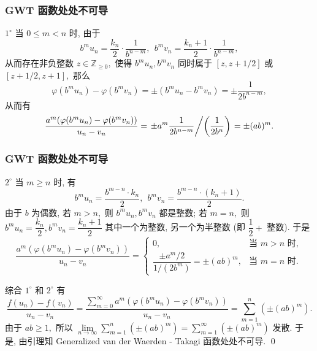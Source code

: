
\begin{frame}
\frametitle{GWT 函数处处不可导}

$1^{\circ}$ 当 $0 \leqslant m < n$ 时, 由于
\begin{equation*}
b^m u_n = \dfrac{k_n}{2} \cdot \dfrac{1}{b^{n-m}}, ~~ b^m v_n = \dfrac{k_n + 1}{2} \cdot \dfrac{1}{b^{n-m}},
\end{equation*}
从而存在非负整数 $z \in \mathbb{Z}_{\geqslant 0},$ 使得 $b^m u_n, b^m v_n$ 同时属于 $[z, z+1/2]$ 或 $[z+1/2, z+1],$ 那么
\begin{equation*}
\varphi(b^m u_n) - \varphi(b^m v_n) = \pm (b^m u_n - b^m v_n) = \pm \dfrac{1}{2 b^{n-m}},
\end{equation*}
从而有
\begin{equation*}
\dfrac{a^m (\varphi(b^m u_n) - \varphi(b^m v_n))}{u_n - v_n}
= \left. \pm a^m \dfrac{1}{2 b^{n-m}} \middle/ \left( \dfrac{1}{2 b^n}\right) \right.
= \pm (ab)^m.
\end{equation*}

\end{frame}


\begin{frame}
\frametitle{GWT 函数处处不可导}

$2^{\circ}$ 当 $m \geqslant n$ 时, 有
\begin{equation*}
b^m u_n = \dfrac{b^{m-n} \cdot k_n}{2}, ~~ b^m v_n = \dfrac{b^{m-n} \cdot (k_n+1)}{2}.
\end{equation*}
由于 $b$ 为偶数, 若 $m > n,$ 则 $b^m u_n, b^m v_n$ 都是整数;
若 $m = n,$ 则 $b^m u_n = \dfrac{k_n}{2}, b^m v_n = \dfrac{k_n + 1}{2}$ 其中一个为整数,
另一个为半整数 (即 $\dfrac{1}{2} +$ 整数). 于是
\begin{equation*}
\dfrac{a^m (\varphi(b^m u_n) - \varphi(b^m v_n))}{u_n - v_n}
= \begin{cases}
0, & \text{当 } m > n \text{ 时}, \\
\dfrac{\pm a^m / 2}{1 / (2 b^{m})} = \pm (ab)^m, & \text{当 } m = n \text{ 时}.
\end{cases}
\end{equation*}

\pause

综合 $1^{\circ}$ 和 $2^{\circ}$ 有
\begin{equation*}
\dfrac{f(u_n) - f(v_n)}{u_n - v_n}
= \dfrac{\sum\limits_{m=0}^{\infty} a^m (\varphi(b^m u_n) - \varphi(b^m v_n))}{u_n - v_n}
= \sum\limits_{m=1}^n \left( \pm (ab)^m \right).
\end{equation*}
由于 $ab \geqslant 1,$ 所以 $\displaystyle \lim\limits_{n\to\infty} \sum\limits_{m=1}^n \left( \pm (ab)^m \right) = \sum\limits_{m=1}^{\infty} \left( \pm (ab)^m \right)$ 发散. 于是, 由引理知 Generalized van der Waerden - Takagi 函数处处不可导.
\qed

\end{frame}



